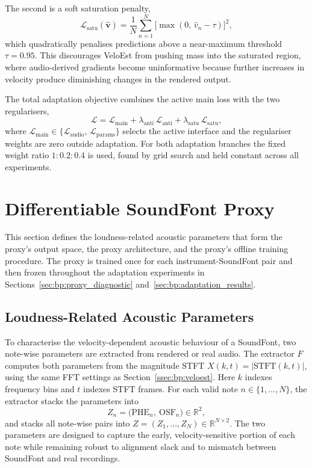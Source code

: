 The second is a soft saturation penalty,
\begin{equation}
\label{eq:bp_satu_loss}
\mathcal{L}_{\mathrm{satu}}(\hat{\mathbf{v}}) = \frac{1}{N}\sum_{n=1}^{N}
\bigl[\max(0,\, \hat{v}_n - \tau)\bigr]^2,
\end{equation}
which quadratically penalises predictions above a near-maximum threshold $\tau = 0.95$. This discourages VeloEst from pushing mass into the saturated region, where audio-derived gradients become uninformative because further increases in velocity produce diminishing changes in the rendered output.

The total adaptation objective combines the active main loss with the two regularisers,
\begin{equation}
\label{eq:bp_total_loss}
\mathcal{L} = \mathcal{L}_{\mathrm{main}}
+ \lambda_{\mathrm{anti}}\, \mathcal{L}_{\mathrm{anti}}
+ \lambda_{\mathrm{satu}}\, \mathcal{L}_{\mathrm{satu}},
\end{equation}
where $\mathcal{L}_{\mathrm{main}} \in \{\mathcal{L}_{\mathrm{audio}},\, \mathcal{L}_{\mathrm{params}}\}$ selects the active interface and the regulariser weights are zero outside adaptation. For both adaptation branches the fixed weight ratio $1 : 0.2 : 0.4$ is used, found by grid search and held constant across all experiments.

\section{Differentiable SoundFont Proxy}
\label{sec:bp:diffsfproxy}

This section defines the loudness-related acoustic parameters that form the proxy's output space, the proxy architecture, and the proxy's offline training procedure. The proxy is trained once for each instrument-SoundFont pair and then frozen throughout the adaptation experiments in Sections~\ref{sec:bp:proxy_diagnostic} and~\ref{sec:bp:adaptation_results}.

\subsection{Loudness-Related Acoustic Parameters}
\label{ssec:bp:acoustic_params}

To characterise the velocity-dependent acoustic behaviour of a SoundFont, two note-wise parameters are extracted from rendered or real audio. The extractor $F$ computes both parameters from the magnitude STFT $X(k,t) = \lvert\mathrm{STFT}(k,t)\rvert$, using the same FFT settings as Section~\ref{ssec:bp:veloest}. Here $k$ indexes frequency bins and $t$ indexes STFT frames. For each valid note $n \in \{1, \ldots, N\}$, the extractor stacks the parameters into
\begin{equation}
\label{eq:bp_Z_def}
Z_n = \bigl(\mathrm{PHE}_n,\ \mathrm{OSF}_n\bigr) \in \mathbb{R}^2,
\end{equation}
and stacks all note-wise pairs into $Z = (Z_1, \ldots, Z_N) \in \mathbb{R}^{N \times 2}$. The two parameters are designed to capture the early, velocity-sensitive portion of each note while remaining robust to alignment slack and to mismatch between SoundFont and real recordings.

